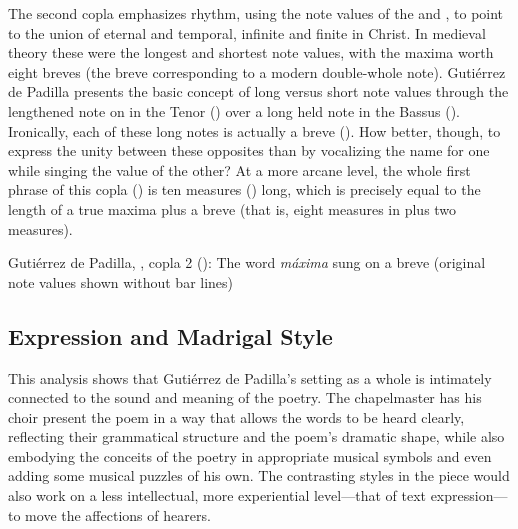 The second copla emphasizes rhythm, using the note values of the 
and , to point to the union of eternal and temporal, infinite and
finite in Christ.
In medieval theory these were the longest and shortest note values, with the
maxima worth eight breves (the breve corresponding to a modern double-whole
note).
Gutiérrez de Padilla presents the basic concept of long versus short note
values through the lengthened note on  in the Tenor
() over a long held note in the Bassus
().
Ironically, each of these long notes is actually a breve
().
How better, though, to express the unity between these opposites than by
vocalizing the name for one while singing the value of the other?
At a more arcane level, the whole first phrase of this copla
() is ten measures () long, which is
precisely equal to the length of a true maxima plus a breve (that is, eight
measures in \meterCThree{} plus two measures).

{Gutiérrez de Padilla, , copla 2
(): The word \emph{máxima} sung on a breve (original note
values shown without bar lines)}


\subsection{Expression and Madrigal Style}

This analysis shows that Gutiérrez de Padilla's setting as a whole is intimately
connected to the sound and meaning of the poetry.
The chapelmaster has his choir present the poem in a way that allows the words
to be heard clearly, reflecting their grammatical structure and the poem's
dramatic shape, while also embodying the conceits of the poetry in appropriate
musical symbols and even adding some musical puzzles of his own.
The contrasting styles in the piece would also work on a less intellectual, more
experiential level---that of text expression---to move the affections of
hearers.


